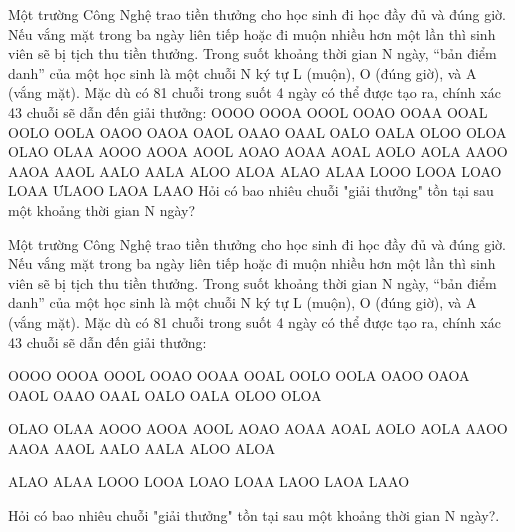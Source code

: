 Một trường Công Nghệ trao tiền thưởng cho học sinh đi học đầy đủ và đúng giờ. Nếu vắng mặt       trong ba ngày liên tiếp hoặc đi muộn nhiều hơn một lần thì sinh viên sẽ bị tịch thu tiền thưởng.       Trong suốt khoảng thời gian N ngày, “bản điểm danh” của một học sinh là một chuỗi N ký tự L       (muộn), O (đúng giờ), và A (vắng mặt).       Mặc dù có 81 chuỗi trong suốt 4 ngày có thể được tạo ra, chính xác 43 chuỗi sẽ dẫn đến giải       thưởng:       OOOO OOOA OOOL OOAO OOAA OOAL OOLO OOLA OAOO OAOA OAOL OAAO OAAL OALO OALA OLOO OLOA       OLAO OLAA AOOO AOOA AOOL AOAO AOAA AOAL AOLO AOLA AAOO AAOA AAOL AALO AALA ALOO ALOA ALAO       ALAA LOOO LOOA LOAO LOAA ƯLAOO LAOA LAAO       Hỏi có bao nhiêu chuỗi "giải thưởng" tồn tại sau một khoảng thời gian N ngày?    

   Một trường Công Nghệ trao tiền thưởng cho học sinh đi học đầy đủ và đúng giờ. Nếu vắng mặt trong ba ngày liên tiếp hoặc đi muộn nhiều hơn một lần thì sinh viên sẽ bị tịch thu tiền thưởng. Trong suốt khoảng thời gian N ngày, “bản điểm danh” của một học sinh là một chuỗi N ký tự L (muộn), O (đúng giờ), và A (vắng mặt). Mặc dù có 81 chuỗi trong suốt 4 ngày có thể được tạo ra, chính xác 43 chuỗi sẽ dẫn đến giải thưởng:  

   OOOO OOOA OOOL OOAO OOAA OOAL OOLO OOLA OAOO OAOA OAOL OAAO OAAL OALO OALA OLOO OLOA  

   OLAO OLAA AOOO AOOA AOOL AOAO AOAA AOAL AOLO AOLA AAOO AAOA AAOL AALO AALA ALOO ALOA  

   ALAO ALAA LOOO LOOA LOAO LOAA LAOO LAOA LAAO  

   Hỏi có bao nhiêu chuỗi "giải thưởng" tồn tại sau một khoảng thời gian N ngày?.  



\